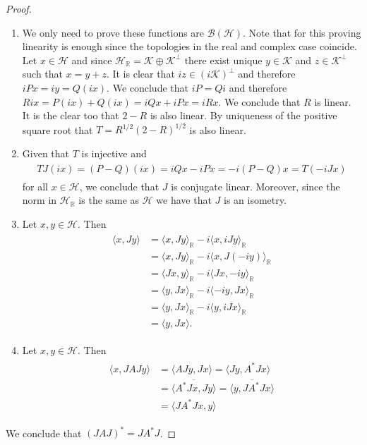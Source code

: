 \begin{proof}
\begin{enumerate}
\item We only need to prove these functions are $\mathcal{B}(\mathcal{H})$. Note that for this proving linearity is enough since the topologies in the real and complex case coincide. Let $x\in\mathcal{H}$ and since $\mathcal{H}_\mathbb{R}=\mathcal{K}\oplus\mathcal{K}^\bot$ there exist unique $y\in\mathcal{K}$ and $z\in\mathcal{K}^\bot$ such that $x=y+z$. It is clear that $iz\in(i\mathcal{K})^\bot$ and therefore $iPx=iy=Q(ix)$. We conclude that $iP=Qi$ and therefore $Rix=P(ix)+Q(ix)=iQx+iPx=iRx$. We conclude that $R$ is linear. It is the clear too that $2-R$ is also linear. By uniqueness of the positive square root that $T=R^{1/2}(2-R)^{1/2}$ is also linear.
\item Given that $T$ is injective and 
\begin{align}
\begin{split}
TJ(ix)=(P-Q)(ix)=iQx-iPx=-i(P-Q)x=T(-iJx)
\end{split}
\end{align}
for all $x\in\mathcal{H}$, we conclude that $J$ is conjugate linear. Moreover, since the norm in $\mathcal{H}_\mathbb{R}$ is the same as $\mathcal{H}$ we have that $J$ is an isometry.
\item Let $x,y\in\mathcal{H}$. Then
\begin{align}
\begin{split}
\langle x,Jy\rangle &= \langle x,Jy\rangle_\mathbb{R}-i\langle x,iJy\rangle_\mathbb{R} \\
&= \langle x,Jy\rangle_\mathbb{R}-i\langle x,J(-iy)\rangle_\mathbb{R} \\
&= \langle Jx,y\rangle_\mathbb{R}-i\langle Jx,-iy\rangle_\mathbb{R} \\
&= \langle y,Jx\rangle_\mathbb{R}-i\langle -iy,Jx\rangle_\mathbb{R} \\
&= \langle y,Jx\rangle_\mathbb{R}-i\langle y,iJx\rangle_\mathbb{R} \\
&= \langle y,Jx \rangle.
\end{split}
\end{align}
\item Let $x,y\in\mathcal{H}$. Then
\begin{align}
\begin{split}
\langle x,JAJy \rangle &= \langle AJy, Jx\rangle = \langle Jy, A^*Jx\rangle \\
&= \overline{\langle A^*Jx,Jy\rangle}=\overline{\langle y, JA^*Jx\rangle} \\
&= \langle JA^*Jx,y\rangle
\end{split}
\end{align}
\end{enumerate}
We conclude that $(JAJ)^*=JA^*J$.
\end{proof}

